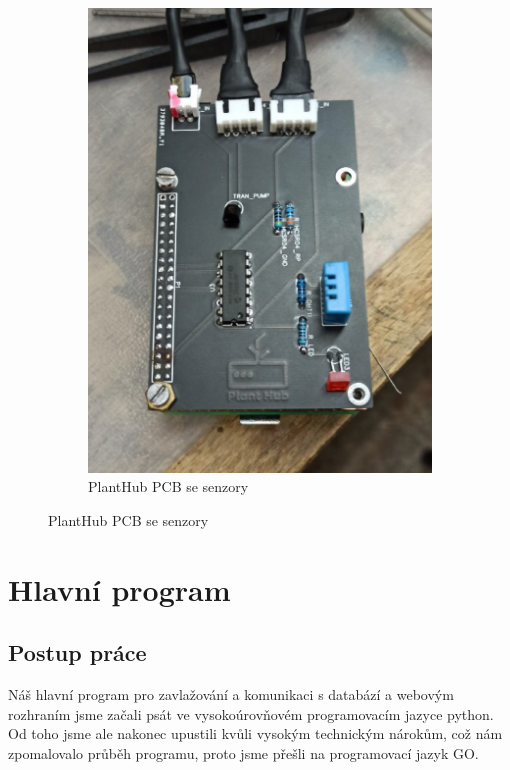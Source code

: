 \documentclass[11pt,a4paper]{article}
\begin{document}
\begin{figure}[h]
\begin{subfigure}[b]{0.4\linewidth}
		\includegraphics[width=\linewidth]{planthub.png}
		\caption*{PlantHub PCB se senzory}
	\end{subfigure}
\end{figure}

\section*{Hlavní program}

\subsection*{Postup práce}

Náš hlavní program pro zavlažování a komunikaci s databází a webovým rozhraním jsme začali psát ve vysokoúrovňovém programovacím jazyce python. Od toho jsme ale nakonec upustili kvůli vysokým technickým nárokům, což nám zpomalovalo průběh programu, proto jsme přešli na programovací jazyk GO.
\end{document}

